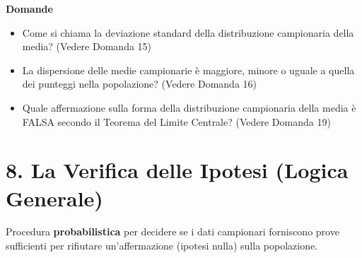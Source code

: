 \documentclass[12pt, a4paper]{article}
\newenvironment{reflectionbox}{%
    \medskip %
    \begin{framed}\par\noindent
    \textbf{\color{boxtitlecolor}Domande} \par
    \begin{itemize}[leftmargin=*, label=$\blacktriangleright$]
}{%
    \end{itemize}\par
    \end{framed}
    \medskip %
}
\begin{document}
\begin{reflectionbox}
    \item Come si chiama la deviazione standard della distribuzione campionaria della media? (Vedere Domanda 15)
    \item La dispersione delle medie campionarie è maggiore, minore o uguale a quella dei punteggi nella popolazione? (Vedere Domanda 16)
    \item Quale affermazione sulla forma della distribuzione campionaria della media è FALSA secondo il Teorema del Limite Centrale? (Vedere Domanda 19)
\end{reflectionbox}

\section*{8. La Verifica delle Ipotesi (Logica Generale)}
Procedura \textbf{probabilistica} per decidere se i dati campionari forniscono prove sufficienti per rifiutare un'affermazione (ipotesi nulla) sulla popolazione.
\end{document}
